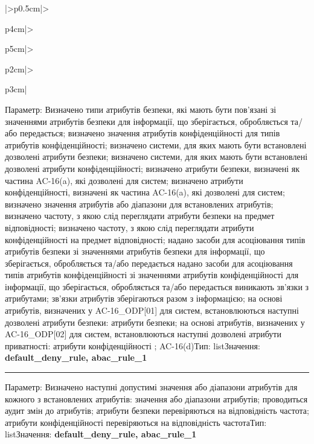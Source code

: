 \documentclass[10pt]{article}
\begin{document}
\begin{longtable}{|>{\centering\arraybackslash}p{0.5cm}|>{\raggedright\arraybackslash}p{4cm}|>{\raggedright\arraybackslash}p{5cm}|>{\raggedright\arraybackslash}p{2cm}|>{\raggedright\arraybackslash}p{3cm}|}
Параметр: Визначено типи атрибутів безпеки, які мають бути пов'язані зі значеннями атрибутів безпеки для інформації, що зберігається, обробляється та/або передається; визначено значення атрибутів конфіденційності для типів атрибутів конфіденційності; визначено системи, для яких мають бути встановлені дозволені атрибути безпеки; визначено системи, для яких мають бути встановлені дозволені атрибути конфіденційності; визначено атрибути безпеки, визначені як частина AC-16(a), які дозволені для систем; визначено атрибути конфіденційності, визначені як частина AC-16(a), які дозволені для систем; визначено значення атрибутів або діапазони для встановлених атрибутів; визначено частоту, з якою слід переглядати атрибути безпеки на предмет відповідності; визначено частоту, з якою слід переглядати атрибути конфіденційності на предмет відповідності; надано засоби для асоціювання типів атрибутів безпеки зі значеннями атрибутів безпеки для інформації, що зберігається, обробляється та/або передається надано засоби для асоціювання типів атрибутів конфіденційності зі значеннями атрибутів конфіденційності для інформації, що зберігається, обробляється та/або передається виникають зв'язки з атрибутами; зв'язки атрибутів зберігаються разом з інформацією; на основі атрибутів, визначених у AC-16\_\allowbreak{}ODP[01] для систем, встановлюються наступні дозволені атрибути безпеки: атрибути безпеки; на основі атрибутів, визначених у AC-16\_\allowbreak{}ODP[02] для систем, встановлюються наступні дозволені атрибути приватності: атрибути конфіденційності ; AC-16(d)\newline Тип: list\newline Значення: \textbf{default\_\allowbreak{}deny\_\allowbreak{}rule, abac\_\allowbreak{}rule\_\allowbreak{}1}\vspace{1mm}\newline\noindent\rule{\linewidth}{0.4pt}\vspace{1mm}
Параметр: Визначено наступні допустимі значення або діапазони атрибутів для кожного з встановлених атрибутів: значення або діапазони атрибутів; проводиться аудит змін до атрибутів; атрибути безпеки перевіряються на відповідність частота; атрибути конфіденційності перевіряються на відповідність частота\newline Тип: list\newline Значення: \textbf{default\_\allowbreak{}deny\_\allowbreak{}rule, abac\_\allowbreak{}rule\_\allowbreak{}1} \\ \hline

\end{longtable}
\end{document}
